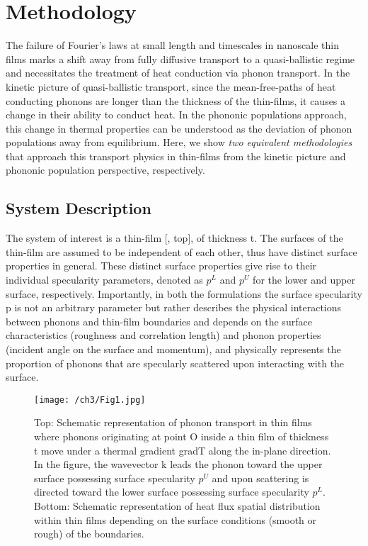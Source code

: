 \section{Methodology}\label{sec:ch3-method}
The failure of Fourier’s laws at small length and timescales in nanoscale thin films marks a shift away from fully diffusive transport to a quasi-ballistic regime and necessitates the treatment of heat conduction via phonon transport. In the kinetic picture of quasi-ballistic transport, since the mean-free-paths of heat conducting phonons are longer than the thickness of the thin-films, it causes a change in their ability to conduct heat. In the phononic populations approach, this change in thermal properties can be understood as the deviation of phonon populations away from equilibrium. Here, we show \textit{two equivalent methodologies} that approach this transport physics in thin-films from the kinetic picture and phononic population perspective, respectively. 	
\subsection{System Description}
The system of interest is a thin-film [, top], of thickness \gls{t}. The surfaces of the thin-film are assumed to be independent of each other, thus have distinct surface properties in general. These distinct surface properties give rise to their individual specularity parameters, denoted as $p^{L}$ and $p^{U}$ for the lower and upper surface, respectively. Importantly, in both the formulations the surface specularity \gls{p} is not an arbitrary parameter but rather describes the physical interactions between phonons and thin-film boundaries and depends on the surface characteristics (roughness and correlation length) and phonon properties (incident angle on the surface and momentum), and physically represents the proportion of phonons that are specularly scattered upon interacting with the surface.

\begin{figure}[hbt]
	\centering \texttt{[image: /ch3/Fig1.jpg]}
	\caption{Top: Schematic representation of phonon transport in thin films where phonons originating at point O inside a thin film of thickness \gls{t} move under a thermal gradient \gls{gradT} along the in-plane direction. In the figure, the wavevector \gls{k} leads the phonon toward the upper surface possessing surface specularity $p^{U}$ and upon scattering is directed toward the lower surface possessing surface specularity $p^{L}$. Bottom: Schematic representation of heat flux spatial distribution within thin films depending on the surface conditions (smooth or rough) of the boundaries.}
	\label{fig:ch3-schematic}
\end{figure}

